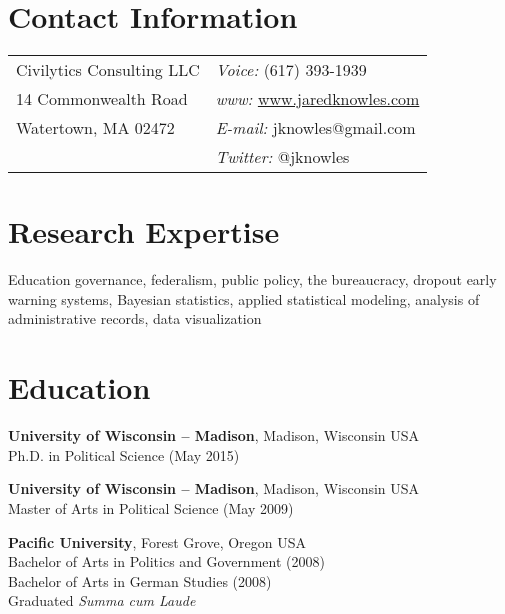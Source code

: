 \documentclass[margin,line]{res}
\begin{document}

\begin{resume}
\section{\sc Contact Information}
\vspace{.05in}
\begin{tabular}{@{}p{2.75in}p{2.75in}}
Civilytics Consulting LLC & {\it Voice:}  (617) 393-1939 \\            
14 Commonwealth Road & {\it www:} \url{www.jaredknowles.com} \\           
Watertown, MA 02472 & {\it E-mail:}  jknowles@gmail.com\\       
 & {\it Twitter:} @jknowles      \\   
\end{tabular}


\section{\sc Research Expertise}
Education governance, federalism, public policy, the bureaucracy, dropout early warning systems, Bayesian statistics, applied statistical modeling, analysis of administrative records, data visualization

\section{\sc Education}
\vspace*{-0.15mm}
{\bf University of Wisconsin -- Madison}, Madison, Wisconsin USA \\
\vspace*{-0.15mm}
Ph.D. in Political Science (May 2015) 

{\bf University of Wisconsin -- Madison}, Madison, Wisconsin USA \\
\vspace*{-0.15mm}
Master of Arts in Political Science (May 2009)

{\bf Pacific University}, Forest Grove, Oregon USA \\
\vspace*{-0.15mm}
Bachelor of Arts in Politics and Government (2008) \\
\vspace*{-0.15mm}
Bachelor of Arts in German Studies (2008) \\
\vspace*{-0.15mm}
Graduated \emph{Summa cum Laude} \\


\end{resume}
\end{document}
